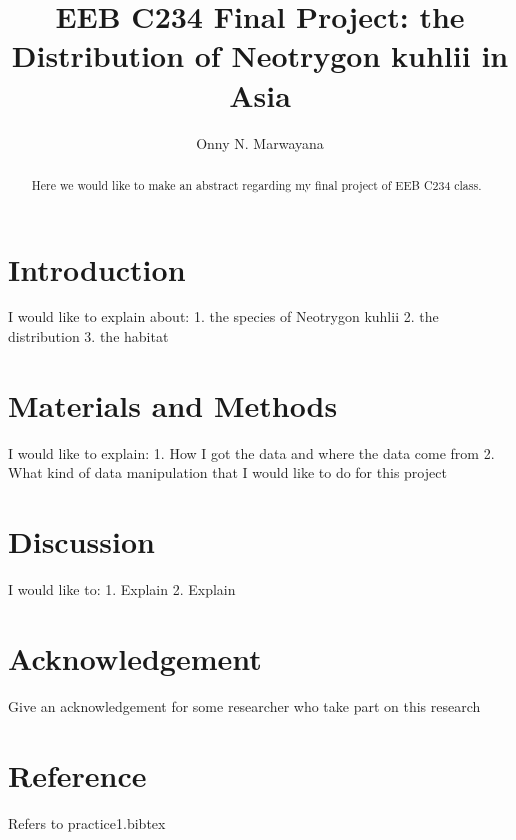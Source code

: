 \documentclass[12pt]{document}
\title{EEB C234 Final Project: the Distribution of Neotrygon kuhlii in Asia}
\author{Onny N. Marwayana}
\date{}
\begin{document}
\maketitle
\begin{abstract}
Here we would like to make an abstract regarding my final project of EEB C234 class.
\end{abstract}
\section{Introduction}
I would like to explain about:
1. the species of Neotrygon kuhlii
2. the distribution
3. the habitat
\section{Materials and Methods}
I would like to explain:
1. How I got the data and where the data come from
2. What kind of data manipulation that I would like to do for this project
\section{Discussion}
I would like to:
1. Explain 
2. Explain
\section{Acknowledgement}
Give an acknowledgement for some researcher who take part on this research
\section{Reference}
Refers to practice1.bibtex
\end{document}
